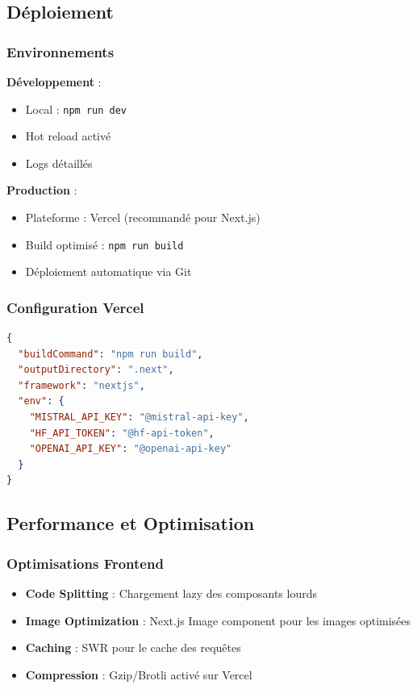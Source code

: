 \subsection{Déploiement}

\subsubsection{Environnements}

\textbf{Développement} :
\begin{itemize}[leftmargin=*]
    \item Local : \texttt{npm run dev}
    \item Hot reload activé
    \item Logs détaillés
\end{itemize}

\textbf{Production} :
\begin{itemize}[leftmargin=*]
    \item Plateforme : Vercel (recommandé pour Next.js)
    \item Build optimisé : \texttt{npm run build}
    \item Déploiement automatique via Git
\end{itemize}

\subsubsection{Configuration Vercel}

\begin{lstlisting}[language=JSON, caption=vercel.json]
{
  "buildCommand": "npm run build",
  "outputDirectory": ".next",
  "framework": "nextjs",
  "env": {
    "MISTRAL_API_KEY": "@mistral-api-key",
    "HF_API_TOKEN": "@hf-api-token",
    "OPENAI_API_KEY": "@openai-api-key"
  }
}
\end{lstlisting}

\subsection{Performance et Optimisation}

\subsubsection{Optimisations Frontend}

\begin{itemize}[leftmargin=*]
    \item \textbf{Code Splitting} : Chargement lazy des composants lourds
    \item \textbf{Image Optimization} : Next.js Image component pour les images optimisées
    \item \textbf{Caching} : SWR pour le cache des requêtes
    \item \textbf{Compression} : Gzip/Brotli activé sur Vercel
\end{itemize}

